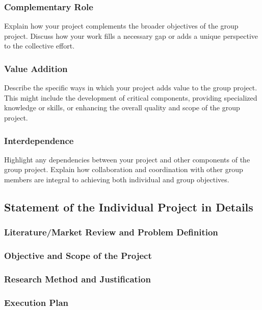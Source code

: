 \documentclass[12pt, a4paper]{article}
\begin{document}
\subsubsection{Complementary Role}

Explain how your project complements the broader objectives of the group project.
Discuss how your work fills a necessary gap or adds a unique perspective to the
collective effort.

\subsubsection{Value Addition}

Describe the specific ways in which your project adds value to the group project.
This might include the development of critical components, providing specialized
knowledge or skills, or enhancing the overall quality and scope of the group
project.

\subsubsection{Interdependence}


Highlight any dependencies between your project and other components of the
group project. Explain how collaboration and coordination with other group
members are integral to achieving both individual and group objectives.


\subsection{Statement of the Individual Project in Details}


\subsubsection{Literature/Market Review and Problem Definition}

\subsubsection{Objective and Scope of the Project}

\subsubsection{Research Method and Justification}

\subsubsection{Execution Plan}
\end{document}
